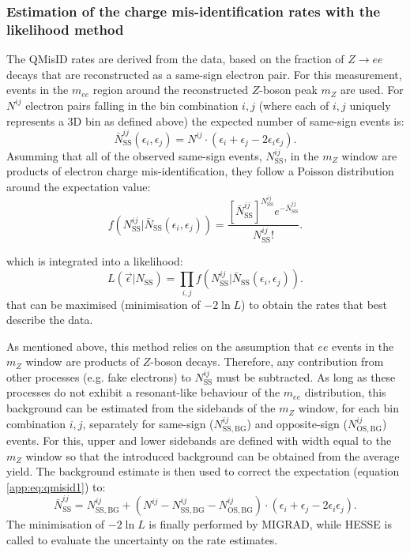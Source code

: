 \subsubsection{Estimation of the charge mis-identification rates with the likelihood method} 
The QMisID rates are derived from the data, based on the fraction of $Z\rightarrow ee$ decays that are reconstructed 
as a same-sign electron pair. For this measurement, events in the $m_{ee}$ region around the reconstructed $Z$-boson 
peak $m_Z$ are used. For $N^{ij}$ electron pairs falling in the bin combination $i,j$ (where each of $i,j$ uniquely 
represents a 3D bin as defined above) the expected number of same-sign events is:
%
\begin{equation}
  \label{app:eq:qmisid1}
  \bar{N}^{ij}_\mathrm{SS}(\epsilon_i,\epsilon_j)=N^{ij}\cdot(\epsilon_i+\epsilon_j-2\epsilon_i\epsilon_j).
\end{equation}
%
Asumming that all of the observed same-sign events, $N^{ij}_\mathrm{SS}$, in the $m_Z$ window are products 
of electron charge mis-identification, they follow a Poisson distribution around the expectation value:
%
\begin{equation}
\label{app:eq:qmisid2}
  f(N^{ij}_\mathrm{SS}|\bar{N}_\mathrm{SS}(\epsilon_i,\epsilon_j))=\frac{[{\bar{N}}^{ij}_\mathrm{SS}]^{N^{ij}_\mathrm{SS}} e^{-{\bar{N}}^{ij}_\mathrm{SS}}}{N^{ij}_\mathrm{SS}!}.
\end{equation}

which is integrated into a likelihood:
%
\begin{equation}
  L(\vec{\epsilon}|N_\mathrm{SS})=\prod_{i,j}f(N^{ij}_\mathrm{SS}|\bar{N}_\mathrm{SS}(\epsilon_i,\epsilon_j)).
\end{equation}
%
that can be maximised (minimisation of $-2\ln L$) to obtain the rates that best describe the data. 

As mentioned above, this method relies on the assumption that $ee$ events in the $m_Z$ window are products of $Z$-boson decays. 
Therefore, any contribution from other processes (e.g. fake electrons) to $N^{ij}_\mathrm{SS}$ must be subtracted. As long as 
these processes do not exhibit a resonant-like behaviour of the $m_{ee}$ distribution, this background can be estimated from 
the sidebands of the $m_{Z}$ window, for each bin combination $i,j$, separately for same-sign ($N^{ij}_\mathrm{SS,BG}$) and 
opposite-sign ($N^{ij}_\mathrm{OS,BG}$) events. For this, upper and lower sidebands are defined with width equal to the $m_{Z}$ 
window so that the introduced background can be obtained from the average yield. The background estimate is then used to correct 
the expectation (equation\,\ref{app:eq:qmisid1}) to:
%
\begin{equation}
  \bar{N}^{ij}_\mathrm{SS} = N^{ij}_\mathrm{SS,BG} + (N^{ij}-N^{ij}_\mathrm{SS,BG}-N^{ij}_\mathrm{OS,BG})\cdot(\epsilon_i+\epsilon_j-2\epsilon_i\epsilon_j).
\end{equation}
%
The minimisation of $-2\ln L$ is finally performed by MIGRAD, while HESSE is called to evaluate the uncertainty on the 
rate estimates. 


